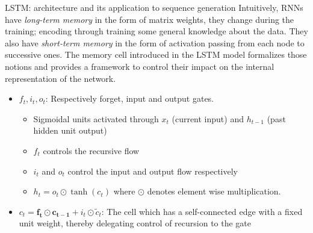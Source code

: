 \documentclass[final]{beamer}
\newlength{\colwidth}
\begin{document}
\begin{frame}[t]
\begin{columns}[t]
\begin{column}{\colwidth}
\begin{block}{LSTM: architecture and its application to sequence generation}
Intuitively, RNNs have \textit{long-term memory} in the form of matrix weights,
they change during the training; encoding through training some general
knowledge about the data. They also have \textit{short-term memory} in the form
of activation passing from each node to successive ones. The memory cell
introduced in the LSTM model formalizes those notions and provides a framework
to control their impact on the internal representation of the network.
\begin{center}
    \begin{itemize}
    \item $f_t, i_t, o_t$: Respectively forget, input and output gates.
        \begin{itemize}
            \normalsize
            \item Sigmoidal units activated through  $x_t$ (current input) and
                $h_{t-1}$ (past hidden unit output) \item $f_t$ controls the
                recursive flow
            \item $i_t$ and $o_t$ control the input and output flow
                respectively
            \item $h_t = o_t \odot \tanh(c_t)$ where $\odot$ denotes element
                wise multiplication.
        \end{itemize}
    \item $c_t = \mathbf{f_t \odot c_{t-1}} + i_t \odot \tilde{c}_t$: The cell
    which has a self-connected edge with a fixed unit weight, thereby delegating
    control of recursion to the gate \end{itemize}
\end{center}

\end{block}


\end{column}
\end{columns}
\end{frame}
\end{document}
